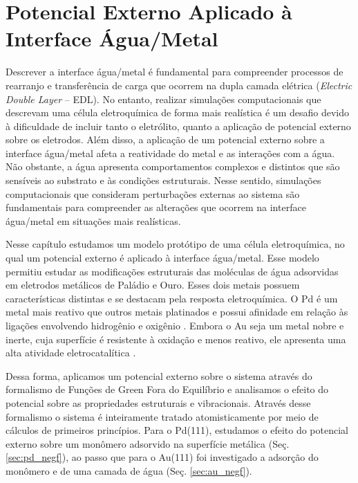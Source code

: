 \chapter{Potencial Externo Aplicado à Interface Água/Metal \label{cap:bias}}

Descrever a interface água/metal é fundamental para compreender processos de rearranjo e transferência de carga que ocorrem na dupla camada elétrica (\textit{Electric Double Layer} -- EDL). No entanto, realizar simulações computacionais que descrevam uma célula eletroquímica de forma mais realística é um desafio devido à dificuldade de incluir tanto o eletrólito, quanto a aplicação de potencial externo sobre os eletrodos. Além disso, a aplicação de um potencial externo sobre a interface água/metal afeta a reatividade do metal e as interações com a água. Não obstante, a água apresenta comportamentos complexos e distintos que são sensíveis ao substrato e às condições estruturais. Nesse sentido, simulações computacionais que consideram perturbações externas ao sistema são fundamentais para compreender as alterações que ocorrem na interface água/metal em situações mais realísticas. 

Nesse capítulo estudamos um modelo protótipo de uma célula eletroquímica, no qual um potencial externo é aplicado à interface água/metal. Esse modelo permitiu estudar as modificações estruturais das moléculas de água adsorvidas em eletrodos metálicos de Paládio e Ouro. Esses dois metais possuem características distintas e se destacam pela resposta eletroquímica. O Pd é um metal mais reativo que outros metais platinados e possui afinidade em relação às ligações envolvendo hidrogênio e oxigênio \cite{paladio}. Embora o Au seja um metal nobre e inerte, cuja superfície é resistente à oxidação e menos reativo, ele apresenta uma alta atividade eletrocatalítica \cite{ouro}.

Dessa forma, aplicamos um potencial externo sobre o sistema através do formalismo de Funções de Green Fora do Equilíbrio e analisamos o efeito do potencial sobre as propriedades estruturais e vibracionais. Através desse formalismo o sistema é inteiramente tratado atomisticamente por meio de cálculos de primeiros princípios. Para o Pd(111), estudamos o efeito do potencial externo sobre um monômero adsorvido na superfície metálica (Seç. \ref{sec:pd_negf}), ao passo que para o Au(111) foi investigado a adsorção do monômero e de uma camada de água (Seç. \ref{sec:au_negf}). 

